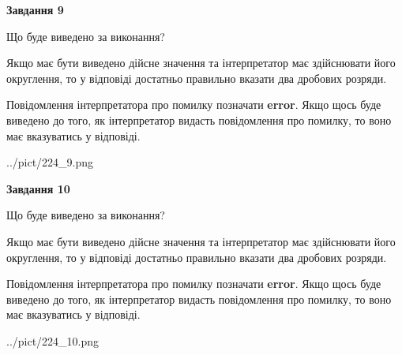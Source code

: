 \documentclass[12pt, ukrainian]{article}
\begin{document}
{\begin {Large}
{\begin {center}\textbf{Завдання 9}\end {center}}\par
Що буде виведено за виконання? \par

Якщо має бути виведено дійсне значення та інтерпретатор має здійснювати його округлення, 
то у відповіді достатньо правильно вказати два дробових розряди.

Повідомлення інтерпретатора про помилку позначати \textbf{error}.
Якщо щось буде виведено до того, як інтерпретатор видасть повідомлення про помилку, 
то воно має вказуватись у відповіді. \par

\begin{center}
	{../pict/224_9.png}
\end{center}
\newpage

{\begin {center}\textbf{Завдання 10}\end {center}}\par
Що буде виведено за виконання? \par

Якщо має бути виведено дійсне значення та інтерпретатор має здійснювати його округлення, 
то у відповіді достатньо правильно вказати два дробових розряди.

Повідомлення інтерпретатора про помилку позначати \textbf{error}.
Якщо щось буде виведено до того, як інтерпретатор видасть повідомлення про помилку, 
то воно має вказуватись у відповіді. \par

\begin{center}
	{../pict/224_10.png}
\end{center}
\newpage

\end {Large}}
\end{document}
